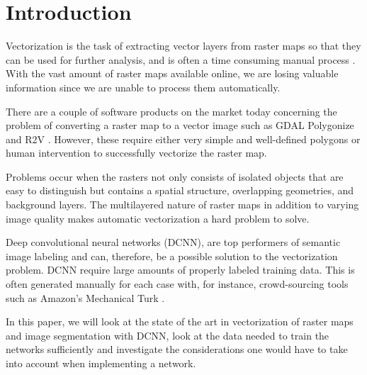 \chapter{Introduction}
Vectorization is the task of extracting vector layers from raster maps so that they can be used for further analysis, and is often a time consuming manual process \cite{Worboys2003}. With the vast amount of raster maps available online, we are losing valuable information since we are unable to process them automatically.

 There are a couple of software products on the market today concerning the problem of converting a raster map to a vector image such as GDAL Polygonize \cite{OSGeoa} and R2V \cite{Wu1999}. However, these require either very simple and well-defined polygons or human intervention to successfully vectorize the raster map.
 
 Problems occur when the rasters not only consists of isolated objects that are easy to distinguish but contains a spatial structure, overlapping geometries, and background layers. The multilayered nature of raster maps in addition to varying image quality makes automatic vectorization a hard problem to solve.
 
 Deep convolutional neural networks (DCNN), are top performers of semantic image labeling \cite{Krizhevsky2012} and can, therefore, be a possible solution to the vectorization problem. DCNN require large amounts of properly labeled training data. This is often generated manually for each case with, for instance, crowd-sourcing tools such as Amazon's Mechanical Turk \cite{Krizhevsky2012}.
 
 In this paper, we will look at the state of the art in vectorization of raster maps and image segmentation with DCNN, look at the data needed to train the networks sufficiently and investigate the considerations one would have to take into account when implementing a network.


